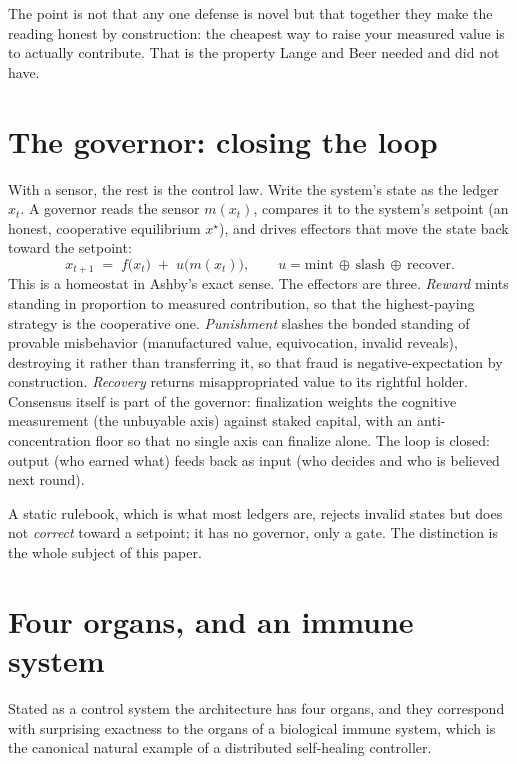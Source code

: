 \documentclass[10pt]{article}
\begin{document}
The point is not that any one defense is novel but that together they make the reading honest by
construction: the cheapest way to raise your measured value is to actually contribute. That is the
property Lange and Beer needed and did not have.

\section{The governor: closing the loop}

With a sensor, the rest is the control law. Write the system's state as the ledger $x_t$. A governor reads
the sensor $m(x_t)$, compares it to the system's setpoint (an honest, cooperative equilibrium $x^\star$),
and drives effectors that move the state back toward the setpoint:
\[
x_{t+1} \;=\; f\big(x_t\big) \;+\; u\big(m(x_t)\big), \qquad
u = \text{mint} \,\oplus\, \text{slash} \,\oplus\, \text{recover}.
\]
This is a homeostat in Ashby's exact sense. The effectors are three. \emph{Reward} mints standing in
proportion to measured contribution, so that the highest-paying strategy is the cooperative one.
\emph{Punishment} slashes the bonded standing of provable misbehavior (manufactured value, equivocation,
invalid reveals), destroying it rather than transferring it, so that fraud is negative-expectation by
construction. \emph{Recovery} returns misappropriated value to its rightful holder. Consensus itself is
part of the governor: finalization weights the cognitive measurement (the unbuyable axis) against staked
capital, with an anti-concentration floor so that no single axis can finalize alone. The loop is closed:
output (who earned what) feeds back as input (who decides and who is believed next round).

A static rulebook, which is what most ledgers are, rejects invalid states but does not \emph{correct}
toward a setpoint; it has no governor, only a gate. The distinction is the whole subject of this paper.

\section{Four organs, and an immune system}

Stated as a control system the architecture has four organs, and they correspond with surprising
exactness to the organs of a biological immune system, which is the canonical natural example of a
distributed self-healing controller.
\end{document}
